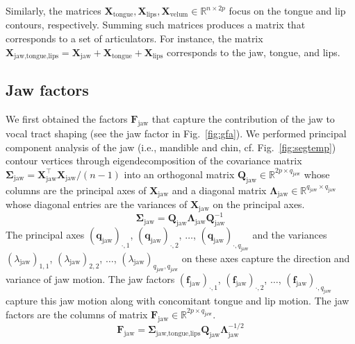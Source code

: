 \documentclass[preprint]{JASAnew}\usepackage[]{graphicx}\usepackage[]{color}
\begin{document}
%
Similarly, the matrices $\mathbf{X}_\text{tongue},\mathbf{X}_\text{lips},\mathbf{X}_\text{velum} \in \mathbb{R}^{n\times 2p}$ focus on the tongue and lip contours, respectively. 
% 
Summing such matrices produces a matrix that corresponds to a set of articulators. For instance, the matrix $\mathbf{X}_{\text{jaw,tongue,lips}} = \mathbf{X}_\text{jaw} + \mathbf{X}_\text{tongue} + \mathbf{X}_\text{lips}$ corresponds to the jaw, tongue, and lips.





\subsection{Jaw factors}
\label{subsec:jawfactors}

We first obtained the factors $\mathbf{F}_\text{jaw}$ that capture the contribution of the jaw to vocal tract shaping (see the jaw factor in Fig.~\ref{fig:gfa}). 
% 
We performed principal component analysis of the jaw (i.e., mandible and chin, cf. Fig.~\ref{fig:segtemp}) contour vertices through eigendecomposition of the covariance matrix $\boldsymbol{\Sigma}_\text{jaw} = \mathbf{X}_\text{jaw}^\intercal \mathbf{X}_\text{jaw}/(n-1)$ into an orthogonal matrix $\mathbf{Q}_\text{jaw} \in \mathbb{R}^{2p\times q_\text{jaw}}$ whose columns are the principal axes of $\mathbf{X}_\text{jaw}$ and a diagonal matrix $\boldsymbol{\Lambda}_\text{jaw} \in \mathbb{R}^{q_\text{jaw} \times q_\text{jaw}}$ whose diagonal entries are the variances of $\mathbf{X}_\text{jaw}$ on the principal axes.
% 
\begin{equation}
\boldsymbol{\Sigma}_\text{jaw} = \mathbf{Q}_\text{jaw}\boldsymbol{\Lambda}_\text{jaw} \mathbf{Q}_\text{jaw}^{-1}
\end{equation}
%
The principal axes $(\mathbf{q}_\text{jaw})_{\cdot,1}$, $(\mathbf{q}_\text{jaw})_{\cdot,2}$, $\ldots$, $(\mathbf{q}_\text{jaw})_{\cdot,q_\text{jaw}}$ and the variances $(\lambda_\text{jaw})_{1,1}$, $(\lambda_\text{jaw})_{2,2}$, $\ldots$, $(\lambda_\text{jaw})_{q_\text{jaw},q_\text{jaw}}$ on these axes capture the direction and variance of jaw motion. 
% 
The jaw factors $(\mathbf{f}_\text{jaw})_{\cdot,1}$, $(\mathbf{f}_\text{jaw})_{\cdot,2}$, $\ldots$, $(\mathbf{f}_\text{jaw})_{\cdot,q_\text{jaw}}$ capture this jaw motion along with concomitant tongue and lip motion.
% 
The jaw factors are the columns of matrix $\mathbf{F}_\text{jaw} \in \mathbb{R}^{2p\times q_\text{jaw}}$. 
%
\begin{equation}
\mathbf{F}_\text{jaw}
 = \boldsymbol{\Sigma}_\text{jaw,tongue,lips} \mathbf{Q}_\text{jaw} \boldsymbol{\Lambda}_\text{jaw}^{-1/2}
\end{equation}
\end{document}
